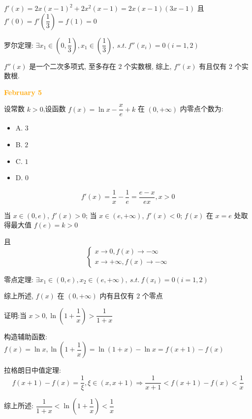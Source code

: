 \begin{solution}

	$f'(x) = 2x(x-1)^{2}+2x^{2}(x-1) = 2x(x-1)(3x-1)$ 且 $f'(0) = f'(\dfrac{1}{3}) = f(1) = 0$

	罗尔定理: $\exists x_{1}\in (0,\dfrac{1}{3}), x_{1}\in(\dfrac{1}{3}),\ s.t.\ f''(x_{i}) = 0(i = 1,2)$

	$f''(x)$ 是一个二次多项式, 至多存在 $2$ 个实数根, 综上, $f''(x)$ 有且仅有 $2$ 个实数根.
\end{solution}

\textcolor{orange}{\textbf{February 5}}

\begin{example}[][Exam: 28.1.9]
	设常数 $k>0$,设函数 $f(x)=\ln x-\dfrac{x}{e}+k$ 在 $(0,+\infty)$ 内零点个数为:
\begin{itemize}
	\item A. $3$
	\item B. $2$
	\item C. $1$
	\item D. $0$
\end{itemize}
\end{example}

\begin{solution}

	$$f'(x) = \dfrac{1}{x}-\dfrac{1}{e} = \dfrac{e-x}{ex}, x > 0$$

	当 $x\in(0,e)$, $f'(x) > 0$; 当 $x\in(e,+\infty)$, $f'(x) < 0$; $f(x)$ 在 $x = e$ 处取得最大值 $f(e) = k > 0$

	且 $$\begin{cases}
		x\to 0, f(x)\to -\infty\\
		x\to +\infty, f(x)\to -\infty
	\end{cases}$$

	零点定理: $\exists x_{1}\in(0,e),x_{2}\in(e,+\infty),\ s.t.\ f(x_{i}) = 0(i = 1,2)$

	综上所述, $f(x)$ 在 $(0,+\infty)$ 内有且仅有 $2$ 个零点
\end{solution}

\begin{example}[][Exam: 28.1.10]
	证明:当 $x>0, \ln(1+\dfrac{1}{x})>\dfrac{1}{1+x}$
\end{example}

\begin{solution}
	
	构造辅助函数: $f(x) = \ln x, \ln(1+\dfrac{1}{x}) = \ln(1+x) -\ln x = f(x+1)-f(x)$

	拉格朗日中值定理: $$f(x+1)-f(x) = \dfrac{1}{\xi}, \xi\in(x,x+1)\Rightarrow \dfrac{1}{x+1}< f(x+1)-f(x) < \dfrac{1}{x}$$

	综上所述: $\dfrac{1}{1+x} < \ln(1+\dfrac{1}{x}) < \dfrac{1}{x}$
\end{solution}

